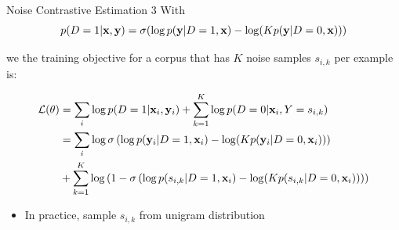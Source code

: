 \documentclass{beamer}
\begin{document}
\begin{frame}{Noise Contrastive Estimation 3}
 With \[p(D=1 | \mathbf{x}, \mathbf{y}) = \sigma(\log p(\mathbf{y}|D=1, \mathbf{x}) - \log(K p(\mathbf{y}|D=0, \mathbf{x})))\]
 
 we the training objective for a corpus that has $K$ noise samples $s_{i,k}$ per example is:
 
   \begin{align*}
\mathcal{L}(\theta) &= \sum_{i} \log p(D=1| \mathbf{x}_i, \mathbf{y}_i) + \sum_{k=1}^{K} \log p(D=0|\mathbf{x}_i, Y=s_{i,k})  \\
&= \sum_{i} \log \sigma\left(\log p(\mathbf{y}_i|D=1, \mathbf{x}_i) - \log(K p(\mathbf{y}_i|D=0, \mathbf{x}_i))\right) \\
& + \sum_{k=1}^{K} \log \left(1 - \sigma\left(\log p(s_{i,k}|D=1, \mathbf{x}_i) - \log(K p(s_{i,k}|D=0, \mathbf{x}_i))\right)\right)
\end{align*}

  \begin{itemize}
  
  \item In practice, sample $s_{i,k}$ from unigram distribution 
%
  \end{itemize}
\end{frame}
\end{document}
